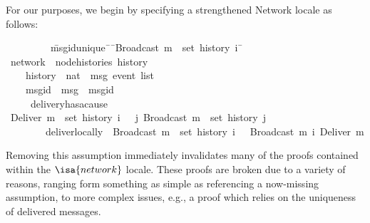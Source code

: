 For our purposes, we begin by specifying a strengthened Network locale as
follows:
\begin{isabelle}
~~~~~~~~\ \=msg{\isacharunderscore}id{\isacharunderscore}unique{\isacharcolon}\ \={\isasymrbrakk}\ \={\isachardoublequoteopen}Broadcast\ m\ {\isasymin}\ set\ {\isacharparenleft}history\ i{\isacharparenright}\ \=\kill
{}\ network\ {\isacharequal}\ node{\isacharunderscore}histories\ history\\
~~~~\>history\ {\isacharcolon}{\isacharcolon}\ {\isachardoublequoteopen}nat\ {\isasymRightarrow}\ {\isacharprime}msg\ event\ list{\isachardoublequoteclose}\ {\isacharplus}\\
~~~~\>msg{\isacharunderscore}id\ {\isacharcolon}{\isacharcolon}\ {\isachardoublequoteopen}{\isacharprime}msg\ {\isasymRightarrow}\ {\isacharprime}msgid{\isachardoublequoteclose}\\
~~~~\ delivery{\isacharunderscore}has{\isacharunderscore}a{\isacharunderscore}cause{\isacharcolon}\\
\>\>{\isasymlbrakk}\ {\isachardoublequoteopen}Deliver\ m\ {\isasymin}\ set\ {\isacharparenleft}history\ i{\isacharparenright}\ \>\>{\isasymrbrakk}\ {\isasymLongrightarrow}\ {\isasymexists}j{\isachardot}\ Broadcast\ m\ {\isasymin}\ set\ {\isacharparenleft}history\ j{\isacharparenright}{\isachardoublequoteclose}\\
~~~~~~~~\>deliver{\isacharunderscore}locally{\isacharcolon}\ \>{\isasymlbrakk}\ \>{\isachardoublequoteopen}Broadcast\ m\ {\isasymin}\ set\ {\isacharparenleft}history\ i{\isacharparenright}\ \>{\isasymrbrakk}\ {\isasymLongrightarrow}\  Broadcast\ m\ {\isasymsqsubset}\isactrlsup i\ Deliver\ m{\isachardoublequoteclose}\\
\end{isabelle}

Removing this assumption immediately invalidates many of the proofs contained
within the $\isa{network}$ locale. These proofs are broken due to a variety of
reasons, ranging form something as simple as referencing a now-missing
assumption, to more complex issues, e.g., a proof which relies on the uniqueness
of delivered messages.

